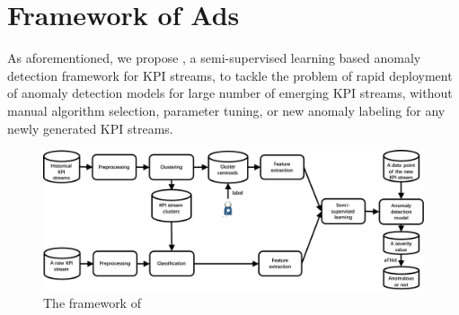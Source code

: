 \section{Framework of Ads}
\label{sec:algorithm}
As aforementioned, we propose \name{}, a semi-supervised learning based anomaly detection framework for KPI streams, to tackle the problem of rapid deployment of anomaly detection models for large number of emerging KPI streams, without manual algorithm selection, parameter tuning, or new anomaly labeling for any newly generated KPI streams.

\begin{figure}
  \centering
  \includegraphics[width=0.9\linewidth]{fig/overview.pdf}
  \caption{
    The framework of~\name{}
  }
  \label{fig:overview}
  \vspace{-6 mm}

\end{figure}





